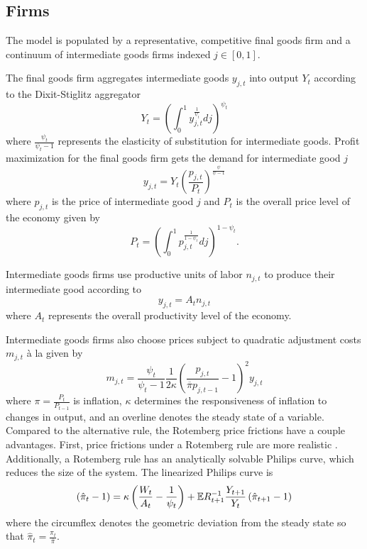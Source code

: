 \subsection{Firms} \label{subsec:firms}

The model is populated by a representative, competitive final goods firm and a continuum of intermediate goods firms indexed $j \in [0, 1]$.

The final goods firm aggregates intermediate goods $y_{j, t}$ into output $Y_t$ according to the Dixit-Stiglitz aggregator
\begin{equation*}
    Y_t = \left( \int_0^1 y_{j, t}^\frac{1}{\psi_t} dj \right)^{\psi_t}
\end{equation*}
where $\frac{\psi_t}{\psi_t - 1}$ represents the elasticity of substitution for intermediate goods. Profit maximization for the final goods firm gets the demand for intermediate good $j$
\begin{equation*}
    y_{j, t} = Y_t \left(\frac{p_{j, t}}{P_t}\right)^\frac{\psi}{\psi - 1}
\end{equation*}
where $p_{j, t}$ is the price of intermediate good $j$ and $P_t$ is the overall price level of the economy given by
\begin{equation*}
    P_t = \left(\int_0^1 p_{j, t}^\frac{1}{1 - \psi_t} dj \right)^{1 - \psi_t}.
\end{equation*}

Intermediate goods firms use productive units of labor $n_{j, t}$ to produce their intermediate good according to
\begin{equation*}
    y_{j, t} = A_t n_{j, t}
\end{equation*}
where $A_t$ represents the overall productivity level of the economy.

Intermediate goods firms also choose prices subject to quadratic adjustment costs $m_{j, t}$ à la \textcite{rotemberg1982sticky} given by
\begin{equation*}
    m_{j, t} = \frac{\psi_t}{\psi_t - 1} \frac{1}{2 \kappa} \left(\frac{p_{j, t}}{\overline{\pi} p_{j, t - 1}} - 1 \right)^2 y_{j, t}
\end{equation*}
where $\pi = \frac{P_t}{P_{t - 1}}$ is inflation, $\kappa$ determines the responsiveness of inflation to changes in output, and an overline denotes the steady state of a variable. Compared to the alternative \textcite{calvo1983staggered} rule, the Rotemberg price frictions have a couple advantages. First, price frictions under a Rotemberg rule are more realistic \autocite{richter2016rotemberg}. Additionally, a Rotemberg rule has an analytically solvable Philips curve, which reduces the size of the system. The linearized Philips curve is
\begin{equation*}
    \left(\hat{\pi}_t - 1\right) = \kappa \left(\frac{W_t}{A_t} - \frac{1}{\psi_t}\right) + \mathbb{E} R_{t + 1}^{-1} \frac{Y_{t + 1}}{Y_t} \left(\hat{\pi}_{t + 1} - 1\right)
\end{equation*}
where the circumflex denotes the geometric deviation from the steady state so that $\hat{\pi}_t = \frac{\pi_t}{\overline{\pi}}$.

